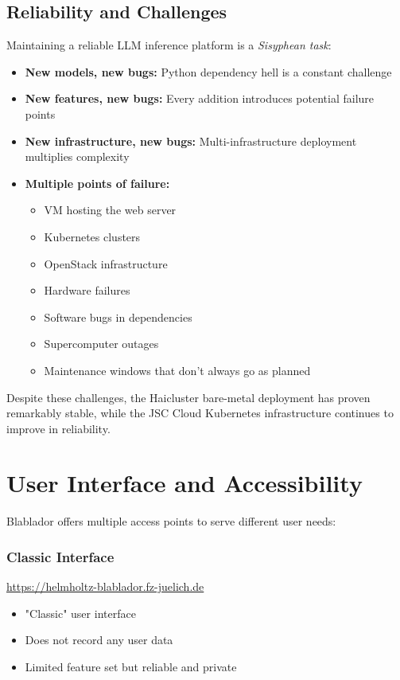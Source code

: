 \documentclass[10pt,conference]{IEEEtran}
\begin{document}
\subsection{Reliability and Challenges}
Maintaining a reliable LLM inference platform is a \emph{Sisyphean task}:

\begin{itemize}
    \item \textbf{New models, new bugs:} Python dependency hell is a constant challenge
    \item \textbf{New features, new bugs:} Every addition introduces potential failure points
    \item \textbf{New infrastructure, new bugs:} Multi-infrastructure deployment multiplies complexity
    
    \item \textbf{Multiple points of failure:}
    \begin{itemize}
        \item VM hosting the web server
        \item Kubernetes clusters
        \item OpenStack infrastructure
        \item Hardware failures
        \item Software bugs in dependencies
        \item Supercomputer outages
        \item Maintenance windows that don't always go as planned
    \end{itemize}
\end{itemize}

Despite these challenges, the Haicluster bare-metal deployment has proven remarkably stable, while the JSC Cloud Kubernetes infrastructure continues to improve in reliability.

\section{User Interface and Accessibility}
Blablador offers multiple access points to serve different user needs:

\subsubsection{Classic Interface}
\url{https://helmholtz-blablador.fz-juelich.de}
\begin{itemize}
    \item "Classic" user interface
    \item Does not record any user data
    \item Limited feature set but reliable and private
\end{itemize}
\end{document}
